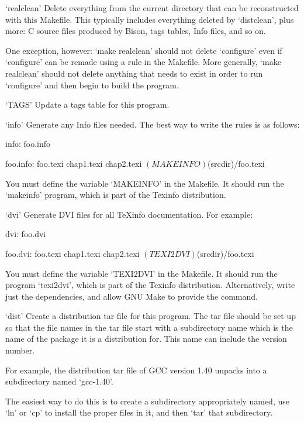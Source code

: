 `realclean'
     Delete everything from the current directory that can be
     reconstructed with this Makefile.  This typically includes
     everything deleted by `distclean', plus more: C source files
     produced by Bison, tags tables, Info files, and so on.

     One exception, however: `make realclean' should not delete
     `configure' even if `configure' can be remade using a rule in the
     Makefile.  More generally, `make realclean' should not delete
     anything that needs to exist in order to run `configure' and then
     begin to build the program.

`TAGS'
     Update a tags table for this program.

`info'
     Generate any Info files needed.  The best way to write the rules
     is as follows:

          info: foo.info
          
          foo.info: foo.texi chap1.texi chap2.texi
                  $(MAKEINFO) $(srcdir)/foo.texi

     You must define the variable `MAKEINFO' in the Makefile.  It should
     run the `makeinfo' program, which is part of the Texinfo
     distribution.

`dvi'
     Generate DVI files for all TeXinfo documentation.  For example:

          dvi: foo.dvi
          
          foo.dvi: foo.texi chap1.texi chap2.texi
                  $(TEXI2DVI) $(srcdir)/foo.texi

     You must define the variable `TEXI2DVI' in the Makefile.  It should
     run the program `texi2dvi', which is part of the Texinfo
     distribution.  Alternatively, write just the dependencies, and
     allow GNU Make to provide the command.

`dist'
     Create a distribution tar file for this program.  The tar file
     should be set up so that the file names in the tar file start with
     a subdirectory name which is the name of the package it is a
     distribution for.  This name can include the version number.

     For example, the distribution tar file of GCC version 1.40 unpacks
     into a subdirectory named `gcc-1.40'.

     The easiest way to do this is to create a subdirectory
     appropriately named, use `ln' or `cp' to install the proper files
     in it, and then `tar' that subdirectory.

